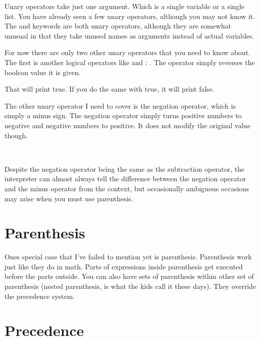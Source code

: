 Unary operators take just one argument.  Which is a single variable or a single list.  You have already seen a few unary operators, although you may not know it.  The  and  keywords are both unary operators, although they are somewhat unusual in that they take unused names as arguments instead of actual variables.

For now there are only two other unary operators that you need to know about.  The first is another logical operators like  and : .  The  operator simply reverses the boolean value it is given.

\begin{SSCodeBox}
\scitea{ }
\end{SSCodeBox}

That will print true.  If you do the same with true, it will print false.

The other unary operator I need to cover is the negation operator, which is simply a minus sign.  The negation operator simply turns positive numbers to negative and negative numbers to positive.  It does not modify the original value though.

\begin{SSCodeBox}
\scitea{;} \\
\end{SSCodeBox}

Despite the negation operator being the same as the subtraction operator, the interpreter can almost always tell the difference between the negation operator and the minus operator from the context, but occasionally ambiguous occasions may arise when you must use parenthesis.

\section{Parenthesis}

Ones special case that I've failed to mention yet is parenthesis.  Parenthesis work just like they do in math.  Parts of expressions inside parenthesis get executed before the parts outside.  You can also have sets of parenthesis within other set of parenthesis (nested parenthesis, is what the kids call it these days).  They override the precedence system.  

\section{Precedence}

